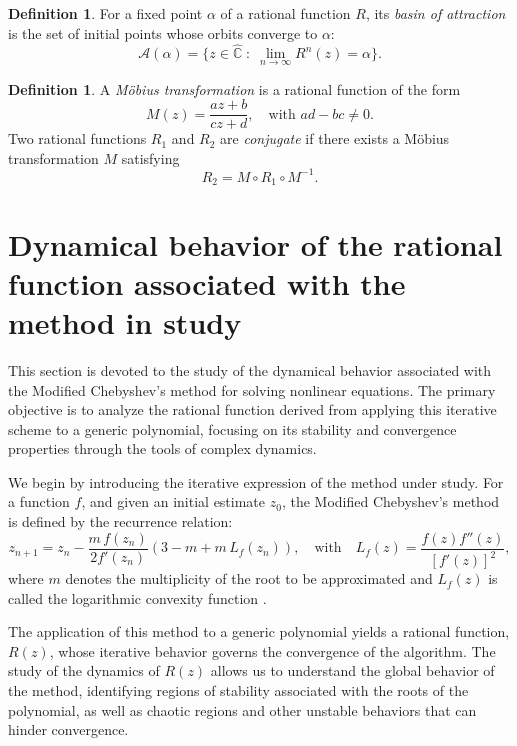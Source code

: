 \documentclass{article}
\theoremstyle{definition}
\newtheorem{definition}[theorem]{Definition}
\theoremstyle{remark}
\begin{document}
\begin{definition}
	For a fixed point \( \alpha \) of a rational function \( R \), its \emph{basin of attraction} is the set of initial points whose orbits converge to \( \alpha \):
	\[
	\mathcal{A}(\alpha) = \{ z \in \hat{\mathbb{C}} \; : \; \lim_{n \to \infty} R^n(z) = \alpha \}.
	\]
\end{definition}

\begin{definition}\label{def:conjugacy}
	A \emph{Möbius transformation} is a rational function of the form
	\[
	M(z) = \frac{az + b}{cz + d}, \quad \text{with } ad - bc \neq 0.
	\]
	Two rational functions \( R_1 \) and \( R_2 \) are \emph{conjugate} if there exists a Möbius transformation \( M \) satisfying
	\[
	R_2 = M \circ R_1 \circ M^{-1}.
	\]
\end{definition}



\section{Dynamical behavior of the rational function associated with the method in study}

This section is devoted to the study of the dynamical behavior associated with the Modified Chebyshev's method for solving nonlinear equations. The primary objective is to analyze the rational function derived from applying this iterative scheme to a generic polynomial, focusing on its stability and convergence properties through the tools of complex dynamics.

We begin by introducing the iterative expression of the method under study. For a function \( f \), and given an initial estimate \( z_0 \), the Modified Chebyshev's method is defined by the recurrence relation:
\begin{equation}\label{ModifiedChebychev}
	z_{n+1} = z_n - \frac{m \, f(z_n)}{2 f'(z_n)} \left( 3 - m + m \, L_f(z_n) \right), \quad \text{with} \quad L_f(z) = \frac{f(z)f''(z)}{[f'(z)]^2},
\end{equation}
where \( m \) denotes the multiplicity of the root to be approximated and $L_f(z)$ is called the logarithmic convexity function \cite{MAHernandez1992}.

The application of this method to a generic polynomial yields a rational function, \( R(z) \), whose iterative behavior governs the convergence of the algorithm. The study of the dynamics of \( R(z) \) allows us to understand the global behavior of the method, identifying regions of stability associated with the roots of the polynomial, as well as chaotic regions and other unstable behaviors that can hinder convergence.
\end{document}
